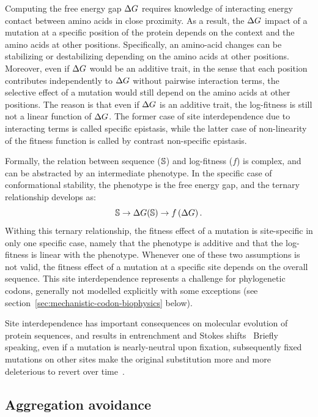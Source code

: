 Computing the free energy gap $\Delta G$ requires knowledge of interacting energy contact between amino acids in close proximity.
As a result, the $\Delta G$ impact of a mutation at a specific position of the protein depends on the context and the amino acids at other positions.
Specifically, an amino-acid changes can be stabilizing or destabilizing depending on the amino acids at other positions.
Moreover, even if $\Delta G$ would be an additive trait, in the sense that each position contributes independently to $\Delta G$ without pairwise interaction terms, the selective effect of a mutation would still depend on the amino acids at other positions.
The reason is that even if $\Delta G$ is an additive trait, the log-fitness is still not a linear function of $\Delta G$.
The former case of site interdependence due to interacting terms is called specific epistasis, while the latter case of non-linearity of the fitness function is called by contrast non-specific epistasis.

Formally, the relation between sequence ($\mathbb{S}$) and log-fitness ($f$) is complex, and can be abstracted by an intermediate phenotype.
In the specific case of conformational stability, the phenotype is the free energy gap, and the ternary relationship develops as:
\begin{equation}
    \mathbb{S} \rightarrow \Delta G (\mathbb{S}) \rightarrow f \left( \Delta G \right).
\end{equation}
Withing this ternary relationship, the fitness effect of a mutation is site-specific in only one specific case, namely that the phenotype is additive and that the log-fitness is linear with the phenotype.
Whenever one of these two assumptions is not valid, the fitness effect of a mutation at a specific site depends on the overall sequence.
This site interdependence represents a challenge for phylogenetic codons, generally not modelled explicitly with some exceptions (see section~\ref{sec:mechanistic-codon-biophysics} below).

Site interdependence has important consequences on molecular evolution  of protein sequences, and results in entrenchment and Stokes shifts~\citep{Pollock2012, Shah2015}
Briefly speaking, even if a mutation is nearly-neutral upon fixation, subsequently fixed mutations on other sites make the original substitution more and more deleterious to revert over time~\citep{Lunzer2010, Naumenko2012, Mccandlish2013}.

\subsection{Aggregation avoidance}


